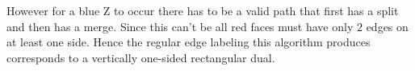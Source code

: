   However for a blue Z to occur there has to be a valid path that first has a split and then has a merge. Since this can't be all red faces must have only $2$ edges on at least one side. Hence the regular edge labeling this algorithm produces corresponds to a vertically one-sided rectangular dual.


